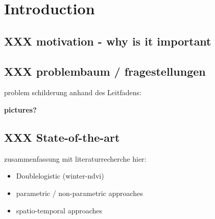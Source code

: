 \chapter{Introduction}

\section{XXX motivation - why is it important}

\section{XXX problembaum / fragestellungen}
problem schilderung anhand des Leitfadens:

\textbf{pictures?}

\section{XXX State-of-the-art}
zusammenfassung mit literaturrecherche hier:
\begin{itemize}
    \item Doublelogistic (winter-ndvi)
    \item parametric / non-parametric approaches
    \item spatio-temporal approaches
\end{itemize}


